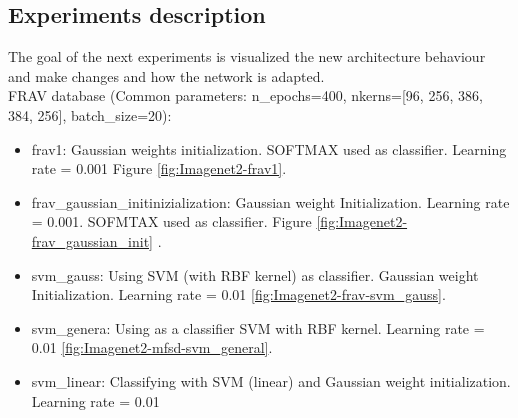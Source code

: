 

\subsection{Experiments description} %
The goal of the next experiments is visualized the new architecture behaviour and make changes and how the network is adapted.\\

FRAV database (Common parameters:  n\_epochs=400, nkerns=[96, 256, 386, 384, 256], batch\_size=20):\\
\begin{itemize}
\item frav1: Gaussian weights initialization. SOFTMAX used as classifier. Learning rate = 0.001 Figure \ref{fig:Imagenet2-frav1}.
\item  frav\_gaussian\_initinizialization: Gaussian weight Initialization. Learning rate = 0.001. SOFMTAX used as classifier. Figure \ref{fig:Imagenet2-frav_gaussian_init} .
\item svm\_gauss: Using SVM (with RBF kernel) as classifier. Gaussian weight Initialization. Learning rate = 0.01 \ref{fig:Imagenet2-frav-svm_gauss}.
\item svm\_genera: Using as a classifier SVM with RBF kernel. Learning rate = 0.01 \ref{fig:Imagenet2-mfsd-svm_general}.
\item svm\_linear: Classifying with SVM (linear) and Gaussian weight initialization. Learning rate = 0.01\\
\end{itemize}

